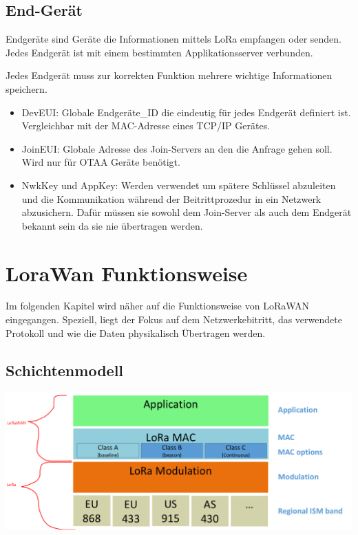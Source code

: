 \documentclass[a4paper,12pt]{article}
\begin{document}
        \subsection{End-Gerät}
            Endgeräte sind Geräte die Informationen mittels LoRa empfangen oder senden. Jedes Endgerät ist mit einem 
            bestimmten Applikationsserver verbunden.

            Jedes Endgerät muss zur korrekten Funktion mehrere wichtige Informationen speichern.
            \begin{itemize}
                \item DevEUI: Globale Endgeräte\_ID die eindeutig für jedes Endgerät definiert ist. Vergleichbar 
                mit der MAC-Adresse eines TCP/IP Gerätes.
                \item JoinEUI: Globale Adresse des Join-Servers an den die Anfrage gehen soll. Wird nur für OTAA Geräte
                benötigt.
                \item NwkKey und AppKey: Werden verwendet um spätere Schlüssel abzuleiten und die Kommunikation während
                der Beitrittprozedur in ein Netzwerk abzusichern. Dafür müssen sie sowohl dem Join-Server als auch dem
                Endgerät bekannt sein da sie nie übertragen werden.
            \end{itemize}
            \cite[S.47 ff.]{LoRaSpec}

    \section{LoraWan Funktionsweise}
        Im folgenden Kapitel wird näher auf die Funktionsweise von LoRaWAN eingegangen. Speziell, liegt der Fokus auf
        dem Netzwerkebitritt, das verwendete Protokoll und wie die Daten physikalisch Übertragen werden.
        \subsection{Schichtenmodell}
            \includegraphics[width=\textwidth]{LoraLayer}
\end{document}
